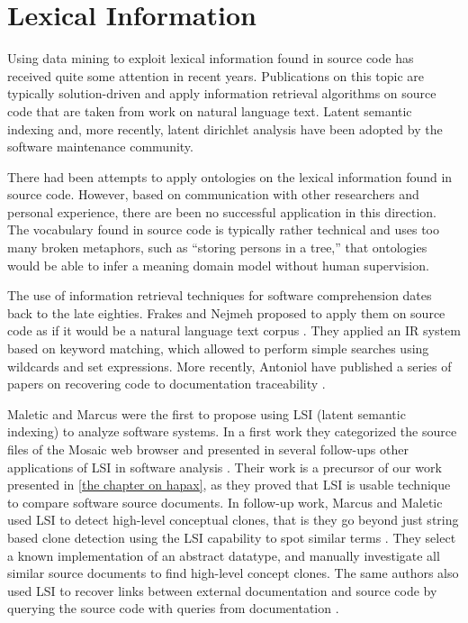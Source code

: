 \section{Lexical Information}

Using data mining to exploit lexical information found in source code has received quite some attention in recent years. Publications on this topic are typically solution-driven and apply information retrieval algorithms on source code that are taken from work on natural language text. Latent semantic indexing \cite{Deer90a} and, more recently, latent dirichlet analysis \cite{Bald08a} have been adopted by the software maintenance community. 

There had been attempts to apply ontologies on the lexical information found in source code. However, based on communication with other researchers and personal experience, there are been no successful application in this direction. The vocabulary found in source code is typically rather technical and uses too many broken metaphors, such as ``storing persons in a tree,'' that ontologies would be able to infer a meaning domain model without human supervision.

The use of information retrieval techniques for software comprehension dates back to the late eighties. Frakes and Nejmeh proposed to apply them on source code as if it would be a natural language text corpus \cite{Frak87a}. They applied an IR system based on keyword matching, which allowed to perform simple searches using wildcards and set expressions. More recently, Antoniol \etal have published a series of papers on recovering code to documentation traceability \cite{Anto00c,Anto02b}. 

Maletic and Marcus were the first to propose using LSI (latent semantic indexing) to analyze software systems. In a first work they categorized the source files of the Mosaic web browser and presented in several follow-ups other applications of LSI in software analysis \cite{Male00a}. Their work is a precursor of our work presented  in \autoref{the chapter on hapax}, as they proved that LSI is usable technique to compare software source documents. In follow-up work, Marcus and Maletic used LSI to detect high-level conceptual clones, that is they go beyond just string based clone detection using the LSI capability to spot similar terms \cite{Marc01a}. They
select a known implementation of an abstract datatype, and manually investigate all similar source documents to find high-level concept clones. The same authors also used LSI to recover links between external documentation and source code by querying the source code with queries from documentation \cite{Marc03b}.

